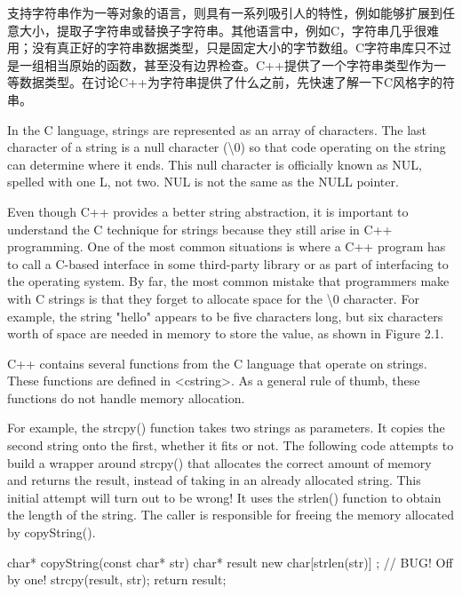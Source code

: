 
支持字符串作为一等对象的语言，则具有一系列吸引人的特性，例如能够扩展到任意大小，提取子字符串或替换子字符串。其他语言中，例如C，字符串几乎很难用；没有真正好的字符串数据类型，只是固定大小的字节数组。C字符串库只不过是一组相当原始的函数，甚至没有边界检查。C++提供了一个字符串类型作为一等数据类型。在讨论C++为字符串提供了什么之前，先快速了解一下C风格字的符串。


In the C language, strings are represented as an array of characters. The last character of a string is a null character (\textbackslash{}0) so that code operating on the string can determine where it ends. This null character is officially known as NUL, spelled with one L, not two. NUL is not the same as the NULL pointer.

Even though C++ provides a better string abstraction, it is important to understand the C technique for strings because they still arise in C++ programming. One of the most common situations is where a C++ program has to call a C-based interface in some third-party library or as part of interfacing to the operating system.
By far, the most common mistake that programmers make with C strings is that they forget to allocate space for the \textbackslash{}0 character. For example, the string "hello" appears to be five characters long, but six characters worth of space are needed in memory to store the value, as shown in Figure 2.1.


C++ contains several functions from the C language that operate on strings. These functions are defined in <cstring>. As a general rule of thumb, these functions do not handle memory allocation.

For example, the strcpy() function takes two strings as parameters. It copies the second string onto the first, whether it fits or not. The following code attempts to build a wrapper around strcpy() that allocates the correct amount of memory and returns the result, instead of taking in an already allocated string. This initial attempt will turn out to be wrong! It uses the strlen() function to obtain the length of the string. The caller is responsible for freeing the memory allocated by copyString().

\begin{cpp}
char* copyString(const char* str)
{
    char* result { new char[strlen(str)] }; // BUG! Off by one!
    strcpy(result, str);
    return result;
}
\end{cpp}


